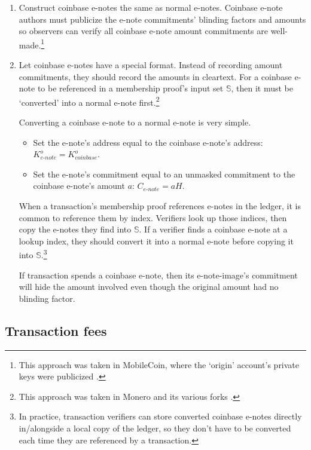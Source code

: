 \begin{enumerate}
    \item Construct coinbase e-notes the same as normal e-notes. Coinbase e-note authors must publicize the e-note commitments' blinding factors and amounts so observers can verify all coinbase e-note amount commitments are well-made.\footnote{This approach was taken in MobileCoin, where the `origin' account's private keys were publicized \cite{mobilecoin-governance-fees-supply}.}

    \item Let coinbase e-notes have a special format. Instead of recording amount commitments, they should record the amounts in cleartext. For a coinbase e-note to be referenced in a membership proof's input set $\mathbb{S}$, then it must be `converted' into a normal e-note first.\footnote{This approach was taken in Monero and its various forks \cite{ztm-2}.}

    Converting a coinbase e-note to a normal e-note is very simple.
    \begin{itemize}
        \item Set the e-note's address equal to the coinbase e-note's address: $K^o_{e\textrm{-}note} = K^o_{coinbase}$.
        \item Set the e-note's commitment equal to an unmasked commitment to the coinbase e-note's amount $a$: $C_{e\textrm{-}note} = a H$.
    \end{itemize}

    When a transaction's membership proof references e-notes in the ledger, it is common to reference them by index. Verifiers look up those indices, then copy the e-notes they find into $\mathbb{S}$. If a verifier finds a coinbase e-note at a lookup index, they should convert it into a normal e-note before copying it into $\mathbb{S}$.\footnote{In practice, transaction verifiers can store converted coinbase e-notes directly in/alongside a local copy of the ledger, so they don't have to be converted each time they are referenced by a transaction.}

    If transaction spends a coinbase e-note, then its e-note-image's commitment will hide the amount involved even though the original amount had no blinding factor.
\end{enumerate}


\subsection{Transaction fees}
\label{subsec:implementers-transaction-fees}

